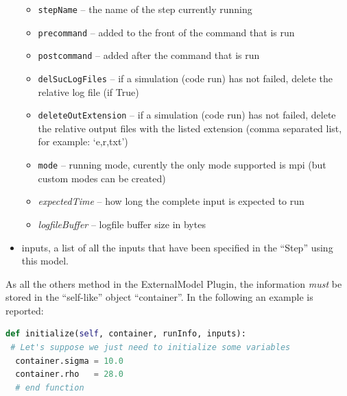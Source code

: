 \begin{itemize}
\begin{itemize}
    \item \texttt{stepName} -- the name of the step currently running
    \item \texttt{precommand} -- added to the front of the command that is run
    \item \texttt{postcommand} -- added after the command that is run
    \item \texttt{delSucLogFiles} -- if a simulation (code run) has not failed,
    delete the relative log file (if True)
    \item \texttt{deleteOutExtension} -- if a simulation (code run) has not
    failed, delete the relative output files with the listed extension (comma
    separated list, for example: `e,r,txt')
    \item \texttt{mode} -- running mode, curently the only mode supported is
      mpi (but custom modes can be created)
    \item \textit{expectedTime} -- how long the complete input is expected to
    run
    \item \textit{logfileBuffer} -- logfile buffer size in bytes
  \end{itemize}
  \item inputs, a list of all the inputs that have been specified in the
  ``Step'' using this model.
\end{itemize}
As all the others method in the ExternalModel Plugin, the information \emph{must} be
stored in the ``self-like'' object ``container''.
In the following an example is reported:
\begin{lstlisting}[language=python]
def initialize(self, container, runInfo, inputs):
 # Let's suppose we just need to initialize some variables
  container.sigma = 10.0
  container.rho   = 28.0
  # end function
\end{lstlisting}

